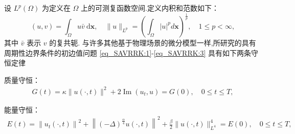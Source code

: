 设 $L^{p}(\Omega)$ 为定义在 $\Omega$ 上的可测复函数空间.定义内积和范数如下：
\begin{equation}
(u, v)=\int_{\Omega} u \bar{v} \mathrm{~d} \boldsymbol{x}, \quad \|u\|_{L^{p}}=\left(\int_{\Omega}|u|^{p} d \boldsymbol{x}\right)^{\frac{1}{p}}, \quad 1 \leq p<\infty,
\label{eq_6}
\end{equation}
其中 $\bar{v}$ 表示 $v$ 的复共轭.
与许多其他基于物理场景的微分模型一样,所研究的具有周期性边界条件的初边值问题 \eqref{eq_SAVRRK:1}-\eqref{eq_SAVRRK:3}  具有如下两条守恒定律\cite{baoUniformErrorEstimates2012,ranLinearlyImplicitConservative2016}

质量守恒：
\begin{align}\label{eq_PAVF:_8}
    G(t)=\kappa\|u(\cdot, t)\|^{2}+2\operatorname{Im}\left(u_{t}, u\right)=G(0), \quad 0 \leq t \leq T,
    \end{align}

	能量守恒：
\begin{align}\label{eq_SAVRRK:9}
	E(t)=\left\|u_{t}(\cdot, t)\right\|^{2}+\left\|(-\Delta)^{\frac{\alpha}{4}} u(\cdot, t)\right\|^{2}+\frac{\beta}{2}\|u(\cdot, t)\|_{L^{4}}^{4}=E(0), \quad 0 \leq t \leq T,
	\end{align}

